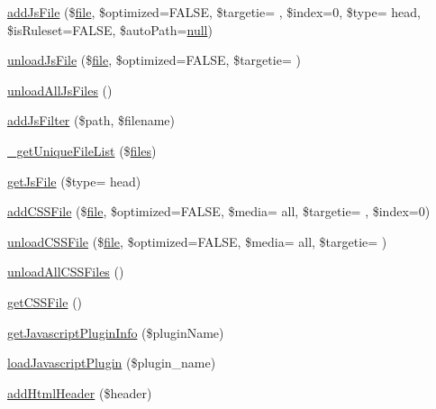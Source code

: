 \begin{DoxyCompactItemize}
\item 
\hyperlink{classContext_a69807c3ced3f97920b233a3fce3bb492}{add\+Js\+File} (\$\hyperlink{classfile}{file}, \$optimized=F\+A\+L\+SE, \$targetie= \textquotesingle{}\textquotesingle{}, \$index=0, \$type= \textquotesingle{}head\textquotesingle{}, \$is\+Ruleset=F\+A\+L\+SE, \$auto\+Path=\hyperlink{modernizr_8min_8js_a286f9ec831c5e676eeb493248eab9575}{null})
\item 
\hyperlink{classContext_ac5016f24f0bd279096d3f0cd0c0df5a9}{unload\+Js\+File} (\$\hyperlink{classfile}{file}, \$optimized=F\+A\+L\+SE, \$targetie= \textquotesingle{}\textquotesingle{})
\item 
\hyperlink{classContext_ac8ac4c21583b50815eb01d9cc4f6405f}{unload\+All\+Js\+Files} ()
\item 
\hyperlink{classContext_ae93f59a2ffac5a3074acd304d10ad7b3}{add\+Js\+Filter} (\$path, \$filename)
\item 
\hyperlink{classContext_a8bde0f7d77424555f9b856664b59e0bc}{\+\_\+get\+Unique\+File\+List} (\$\hyperlink{popup_8min_8js_a0742cac2750bccc2d88ac080fb9daa22}{files})
\item 
\hyperlink{classContext_aa3844fdfe0768191c5cef3aef8db1115}{get\+Js\+File} (\$type= \textquotesingle{}head\textquotesingle{})
\item 
\hyperlink{classContext_ac024e3744d631bf487ded23c2c6c7e24}{add\+C\+S\+S\+File} (\$\hyperlink{classfile}{file}, \$optimized=F\+A\+L\+SE, \$media= \textquotesingle{}all\textquotesingle{}, \$targetie= \textquotesingle{}\textquotesingle{}, \$index=0)
\item 
\hyperlink{classContext_aa8ef9bdf406752ca2f6a9746e239eb4e}{unload\+C\+S\+S\+File} (\$\hyperlink{classfile}{file}, \$optimized=F\+A\+L\+SE, \$media= \textquotesingle{}all\textquotesingle{}, \$targetie= \textquotesingle{}\textquotesingle{})
\item 
\hyperlink{classContext_a9eb05677aeb2e95029a10919ffc6053f}{unload\+All\+C\+S\+S\+Files} ()
\item 
\hyperlink{classContext_a1b14cb135e24cc9c79414a50575cf309}{get\+C\+S\+S\+File} ()
\item 
\hyperlink{classContext_abf616bb3259e090c6e85b3aa1b581b60}{get\+Javascript\+Plugin\+Info} (\$plugin\+Name)
\item 
\hyperlink{classContext_acaea76bdc1334df9c2f088103d619593}{load\+Javascript\+Plugin} (\$plugin\+\_\+name)
\item 
\hyperlink{classContext_a26a1aea944ae54bb826500f544a67950}{add\+Html\+Header} (\$header)
\item 

\end{DoxyCompactItemize}
